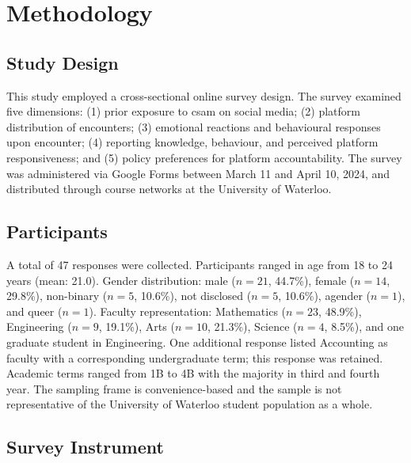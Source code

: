 \documentclass{ieee-portfolio}
\begin{document}
\section{Methodology}
 
\subsection{Study Design}
 
This study employed a cross-sectional online survey design. The survey examined five dimensions: (1) prior exposure to \gls{csam} on social media; (2) platform distribution of encounters; (3) emotional reactions and behavioural responses upon encounter; (4) reporting knowledge, behaviour, and perceived platform responsiveness; and (5) policy preferences for platform accountability. The survey was administered via Google Forms between March 11 and April 10, 2024, and distributed through course networks at the University of Waterloo.
 
\subsection{Participants}
 
A total of 47 responses were collected. Participants ranged in age from 18 to 24 years (mean: 21.0). Gender distribution: male ($n = 21$, 44.7\%), female ($n = 14$, 29.8\%), non-binary ($n = 5$, 10.6\%), not disclosed ($n = 5$, 10.6\%), agender ($n = 1$), and queer ($n = 1$). Faculty representation: Mathematics ($n = 23$, 48.9\%), Engineering ($n = 9$, 19.1\%), Arts ($n = 10$, 21.3\%), Science ($n = 4$, 8.5\%), and one graduate student in Engineering. One additional response listed Accounting as faculty with a corresponding undergraduate term; this response was retained. Academic terms ranged from 1B to 4B with the majority in third and fourth year. The sampling frame is convenience-based and the sample is not representative of the University of Waterloo student population as a whole.
 
\subsection{Survey Instrument}
 
\end{document}

